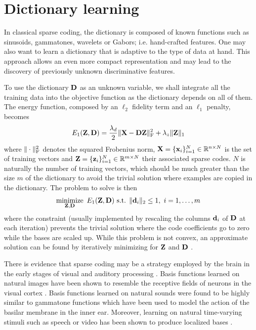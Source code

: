 \section{Dictionary learning}

In classical sparse coding, the dictionary is composed of known functions such as sinusoids, gammatones, wavelets or Gabors; i.e. hand-crafted features. One may also want to learn a dictionary that is adaptive to the type of data at hand. This approach allows an even more compact representation and may lead to the discovery of previously unknown discriminative features.

To use the dictionary $\mathbf{D}$ as an unknown variable, we shall integrate all the training data into the objective function as the dictionary depends on all of them. The energy function, composed by an $\ell_2$ fidelity term and an $\ell_1$ penalty, becomes
\begin{equation}\label{eqn:en_dict}
E_1(\mathbf{Z}, \mathbf{D}) = \frac{\lambda_d}{2} \| \mathbf{X} - \mathbf{D} \mathbf{Z} \|_\text{F}^2 + \lambda_z \| \mathbf{Z} \|_1
\end{equation}
where $\| \cdot \|_\text{F}^2$ denotes the squared Frobenius norm, $\mathbf{X} = \{\mathbf{x}_i\}_{i=1}^N \in \mathbb{R}^{n \times N}$ is the set of training vectors and $\mathbf{Z} = \{\mathbf{z}_i\}_{i=1}^N \in \mathbb{R}^{m \times N}$ their associated sparse codes. $N$ is naturally the number of training vectors, which should be much greater than the size $m$ of the dictionary to avoid the trivial solution where examples are copied in the dictionary. The problem to solve is then
\begin{equation}\label{eqn:pr_dict}
\operatorname*{minimize}\limits_{\mathbf{Z},\mathbf{D}} \  E_1(\mathbf{Z}, \mathbf{D}) \text{ s.t. } \|\mathbf{d}_i\|_2 \leq 1, \ i = 1, \ldots, m
\end{equation}
where the constraint (usually implemented by rescaling the columns $\mathbf{d}_i$ of $\mathbf{D}$ at each iteration) prevents the trivial solution where the code coefficients go to zero while the bases are scaled up. While this problem is not convex, an approximate solution can be found by iteratively minimizing for $\mathbf{Z}$ and $\mathbf{D}$ \cite{olshausen1996SparseV1}.

There is evidence that sparse coding may be a strategy employed by the brain in the early stages of visual and auditory processing \cite{olshausen1996SparseV1, olshausen1997SparseV1, smith2006SparseAudio}. Basis functions learned on natural images have been shown to resemble the receptive fields of neurons in the visual cortex \cite{olshausen1996SparseV1, olshausen1997SparseV1}. Basis functions learned on natural sounds were found to be highly similar to gammatone functions \cite{smith2006SparseAudio} which have been used to model the action of the basilar membrane in the inner ear. Moreover, learning on natural time-varying stimuli such as speech or video has been shown to produce localized bases \cite{lewicki2000SparseSpeech, olshausen2000SparseVideo}.

